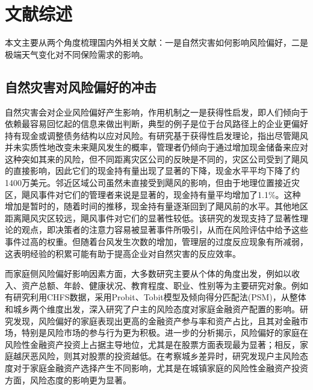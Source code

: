 \section{文献综述}

本文主要从两个角度梳理国内外相关文献：一是自然灾害如何影响风险偏好，二是极端天气变化对不同保险需求的影响。

\subsection{自然灾害对风险偏好的冲击}

自然灾害会对企业风险偏好产生影响，作用机制之一是获得性启发\citep{tversky1973availability}，即人们倾向于依赖最容易回忆起的信息来做出判断，典型的例子是位于台风路径上的企业更偏好持有现金\citep{杨娜娜2019自然灾害与企业现金持有}或调整债务结构\citep{shao2024typhoons}以应对风险。有研究基于获得性启发理论\citep{0Do}，指出尽管飓风并未实质性地改变未来飓风发生的概率，管理者仍倾向于通过增加现金储备来应对这种突如其来的风险，但不同距离灾区公司的反映是不同的，灾区公司受到了飓风的直接影响，因此它们的现金持有量出现了显著的下降，现金水平平均下降了约1400万美元。邻近区域公司虽然未直接受到飓风的影响，但由于地理位置接近灾区，飓风事件对它们的管理者来说是显著的，现金持有量平均增加了1.1\%。这种增加是暂时的，随着时间的推移，现金持有量逐渐回到了飓风前的水平。其他地区距离飓风灾区较远，飓风事件对它们的显著性较低。该研究的发现支持了显著性理论的观点，即决策者的注意力容易被显著事件所吸引，从而在风险评估中给予这些事件过高的权重。但随着台风发生次数的增加，管理层的过度反应现象有所减弱，这表明经验的积累可能有助于提高企业对自然灾害的反应效率。

而家庭侧风险偏好影响因素方面，大多数研究主要从个体的角度出发，例如以收入\citep{石双2018收入与风险偏好}、资产总额\citep{卢亚娟殷君瑶2021户主风险态度对家庭金融资产配置的影响研究}、年龄\citep{王晶2021年龄结构}、健康状况\citep{雷晓燕2010中国家庭的资产组合选择}、教育程度\citep{梁立俊2018受教育程度与主客观风险偏好}、职业\citep{赵颖2017中国劳动者的风险偏好与职业选择}、性别\citep{徐小华2019女性劳动参与会影响家庭资产配置风险偏好吗}等为主要研究对象。例如有研究利用CHFS数据，采用Probit、Tobit模型及倾向得分匹配法(PSM)，从整体和城乡两个维度出发，深入研究了户主的风险态度对家庭金融资产配置的影响\citep{卢亚娟殷君瑶2021户主风险态度对家庭金融资产配置的影响研究}。研究发现，风险偏好的家庭表现出更高的金融资产参与率和资产占比，且其对金融市场，特别是风险市场的参与行为更为积极。进一步的分析揭示，风险偏好的家庭在风险性金融资产投资上占据主导地位，尤其是在股票方面表现最为显著；相反，家庭越厌恶风险，则其对股票的投资越低。在考察城乡差异时，研究发现户主风险态度对于家庭金融资产选择产生不同影响，尤其是在城镇家庭的风险性金融资产投资方面，风险态度的影响更为显著。

